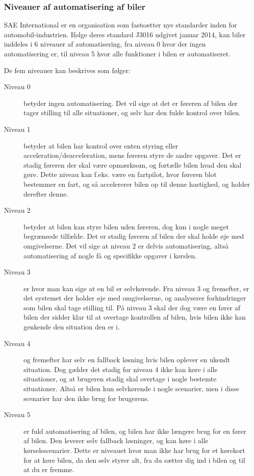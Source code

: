 \subsubsection{Niveauer af automatisering af biler}
SAE International er en organisation som fastsætter nye standarder inden for automobil-industrien. Ifølge deres standard J3016 udgivet januar 2014, kan biler inddeles i 6 niveauer af automatisering, fra niveau 0 hvor der ingen automatisering er, til niveau 5 hvor alle funktioner i bilen er automatiseret\cite{SAE_J3016}. 

De fem niveauer kan beskrives som følger:

\begin{description}
	\item[Niveau 0] betyder ingen automatisering. Det vil sige at det er føreren af bilen der tager stilling til alle situationer, og selv har den fulde kontrol over bilen.
	\item[Niveau 1] betyder at bilen har kontrol over enten styring eller acceleration/deacceleration, mens føreren styre de andre opgaver.  Det er stadig føreren der skal være opmærksom, og fortælle bilen hvad den skal gøre. Dette niveau kan f.eks. være en fartpilot, hvor føreren blot bestemmer en fart, og så accelererer bilen op til denne hastighed, og holder derefter denne. 
	\item[Niveau 2] betyder at bilen kan styre bilen uden føreren, dog kun i nogle meget begrænsede tilfælde. Det er stadig føreren af bilen der skal holde øje med omgivelserne. Det vil sige at niveau 2 er delvis automatisering, altså automatisering af nogle få og specifikke opgaver i kørslen.
	\item[Niveau 3] er hvor man kan sige at en bil er selvkørende. Fra niveau 3 og fremefter, er det systemet der holder øje med omgivelserne, og analyserer forhindringer som bilen skal tage stilling til. På niveau 3 skal der dog være en fører af bilen der sidder klar til at overtage kontrollen af bilen, hvis bilen ikke kan genkende den situation den er i.
	\item[Niveau 4] og fremefter har selv en fallback løsning hvis bilen oplever en ukendt situation. Dog gælder det stadig for niveau 4 ikke kan køre i alle situationer, og at brugeren stadig skal overtage i nogle bestemte situationer. Altså er bilen kun selvkørende i nogle scenarier, men i disse scenarier har den ikke brug for brugerens.
	\item[Niveau 5] er fuld automatisering af bilen, og bilen har ikke længere brug for en fører af bilen. Den leverer selv fallback løsninger, og kan køre i alle kørselsscenarier. Dette er niveauet hvor man ikke har brug for et kørekort for at køre bilen, da den selv styrer alt, fra du sætter dig ind i bilen og til at du er fremme.
\end{description}

